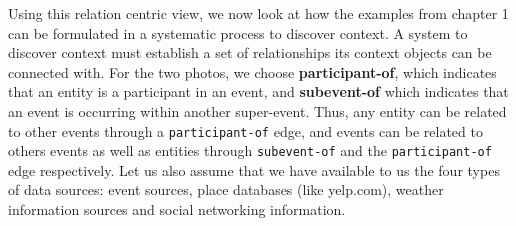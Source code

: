 Using this relation centric view, we now look at how the examples from chapter 1 can be formulated in a systematic process to discover context. A system to discover context must establish a set of relationships its context objects can be connected with. For the two photos, we choose \textbf{participant-of}, which indicates that an entity is a participant in an event, and \textbf{subevent-of} which indicates that an event is occurring within another super-event. Thus, any entity can be related to other events through a \texttt{participant-of} edge, and events can be related to others events as well as entities through \texttt{subevent-of} and the \texttt{participant-of} edge respectively. Let us also assume that we have available to us the four types of data sources: event sources, place databases (like yelp.com), weather information sources and social networking information.

